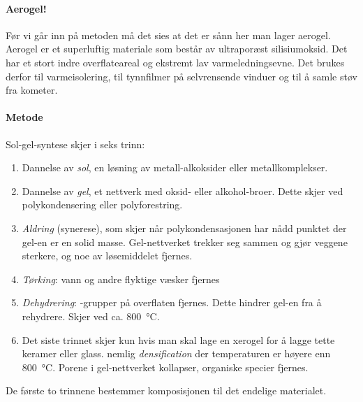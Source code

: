 \paragraph{Aerogel!} Før vi går inn på metoden må det sies at det er sånn her man lager aerogel. Aerogel er et superluftig materiale som består av ultraporæst silisiumoksid. Det har et stort indre overflateareal og ekstremt lav varmeledningsevne. Det brukes derfor til varmeisolering, til tynnfilmer på selvrensende vinduer og til å samle støv fra kometer.

\paragraph{Metode} Sol-gel-syntese skjer i seks trinn:
\begin{enumerate}
	\item Dannelse av \emph{sol}, en løsning av metall-alkoksider eller metallkomplekser.
	\item Dannelse av \emph{gel}, et nettverk med oksid- eller alkohol-broer. Dette skjer ved polykondensering eller polyforestring.
	\item \emph{Aldring} (synerese), som skjer når polykondensasjonen har nådd punktet der gel-en er en solid masse. Gel-nettverket trekker seg sammen og gjør veggene sterkere, og noe av løsemiddelet fjernes.
	\item \emph{Tørking}: vann og andre flyktige væsker fjernes
	\item \emph{Dehydrering}: -grupper på overflaten fjernes. Dette hindrer gel-en fra å rehydrere. Skjer ved ca. \SI{800}{\celsius}.
	\item Det siste trinnet skjer kun hvis man skal lage en xerogel for å lagge tette keramer eller glass. nemlig \emph{densification} der temperaturen er høyere enn \SI{800}{\celsius}. Porene i gel-nettverket kollapser, organiske specier fjernes.
\end{enumerate}
De første to trinnene bestemmer komposisjonen til det endelige materialet. 

